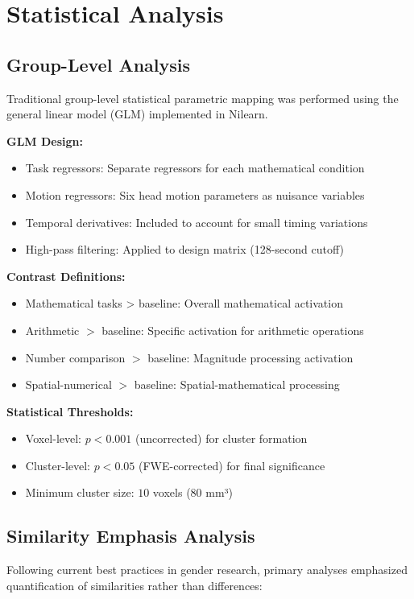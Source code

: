 \documentclass[12pt, a4paper]{article}
\begin{document}
\section{Statistical Analysis}
\subsection{Group-Level Analysis}
Traditional group-level statistical parametric mapping was performed using the general linear model (GLM) implemented in Nilearn.

\vspace{0.5\baselineskip}
\noindent
\textbf{GLM Design:}
\begin{itemize}
\item Task regressors: Separate regressors for each mathematical condition
\item Motion regressors: Six head motion parameters as nuisance variables
\item Temporal derivatives: Included to account for small timing variations
\item High-pass filtering: Applied to design matrix (128-second cutoff)
\end{itemize}

\noindent
\textbf{Contrast Definitions:}
\begin{itemize}
\item Mathematical tasks > baseline: Overall mathematical activation
\item Arithmetic $>$ baseline: Specific activation for arithmetic operations
\item Number comparison $>$ baseline: Magnitude processing activation
\item Spatial-numerical $>$ baseline: Spatial-mathematical processing
\end{itemize}

\noindent
\textbf{Statistical Thresholds:}
\begin{itemize}
\item Voxel-level: $p < 0.001$ (uncorrected) for cluster formation
\item Cluster-level: $p < 0.05$ (FWE-corrected) for final significance
\item Minimum cluster size: $10$ voxels (80 mm³)
\end{itemize}

\subsection{Similarity Emphasis Analysis}
Following current best practices in gender research, primary analyses emphasized quantification of similarities rather than differences:
\end{document}
